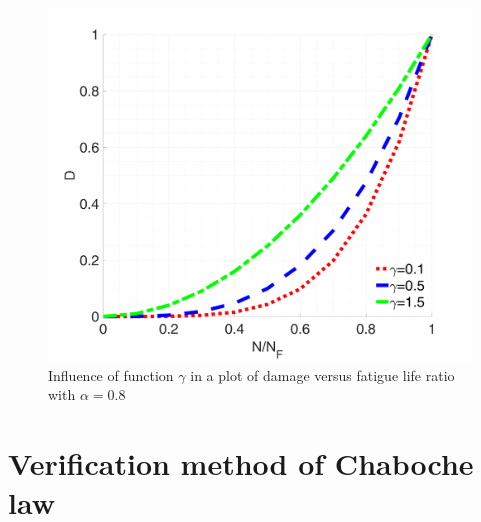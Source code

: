 \begin{figure}[!h]
	\centering
	\includegraphics[width=\textwidth]{figures//Dratio2.png}
	\vspace{-12pt}
	\caption{Influence of function $\gamma$ in a plot of  damage versus fatigue life ratio with $\alpha=0.8$}
\end{figure}

\clearpage
\section{Verification method of Chaboche law}

